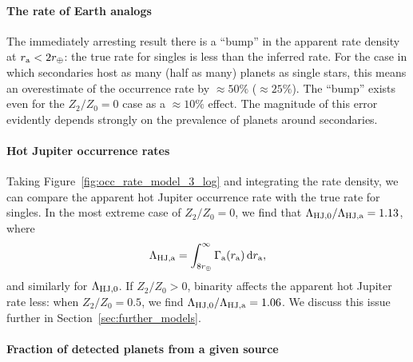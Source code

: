 \documentclass[12pt,modern]{aastex61}
\renewcommand{\a}{_{\rm a}}
\begin{document}
\paragraph{The rate of Earth analogs} The immediately arresting result
there is a ``bump'' in the apparent rate density at $r\a < 2r_\oplus$:
the true rate for singles is less than the inferred rate.  For the
case in which secondaries host as many (half as many) planets as
single stars, this means an overestimate of the occurrence
rate by $\approx 50\%$ ($\approx 25\%$).  The ``bump'' exists even for
the $Z_2/Z_0=0$ case as a $\approx 10\%$ effect.  The magnitude of
this error evidently depends strongly on the prevalence of planets
around secondaries.

\paragraph{Hot Jupiter occurrence rates} Taking
Figure~\ref{fig:occ_rate_model_3_log} and integrating the rate
density, we can compare the apparent hot Jupiter occurrence rate with
the true rate for singles.  In the most extreme case of $Z_2/Z_0=0$,
we find that $\Lambda_{{\rm HJ},0}/\Lambda_{\rm HJ,a} = 1.13$, where
\begin{equation}
    \Lambda_{\rm HJ,a} =
      \int_{8r_\oplus}^{\infty} \Gamma\a(r\a)\,{\rm d}r\a,
\end{equation}
and similarly for $\Lambda_{\rm HJ,0}$.
If $Z_2/Z_0>0$, binarity affects the apparent hot Jupiter rate less:
when $Z_2/Z_0=0.5$, we find $\Lambda_{{\rm HJ},0}/\Lambda_{\rm HJ,a} =
1.06$.  We discuss this issue further in
Section~\ref{sec:further_models}.

\paragraph{Fraction of detected planets from a given source}
\end{document}
